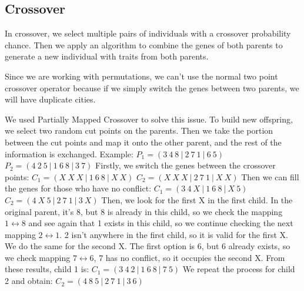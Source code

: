 \subsection{Crossover}
In crossover, we select multiple pairs of individuals with a crossover probability chance. Then we apply an algorithm to combine the genes of both parents to generate a new individual with traits from both parents.
\par
Since we are working with permutations, we can't use the normal two point crossover operator because if we simply switch the genes between two parents, we will have duplicate cities.
\par
We used Partially Mapped Crossover to solve this issue. To build new offspring, we select two random cut points on the parents. Then we take the portion between the cut points and map it onto the other parent, and the rest of the information is exchanged.
\newline
Example:
\newline
$P_{1} = (3\:4\:8\:|\:2\:7\:1\:|\:6\:5)$
\newline
$P_{2} = (4\:2\:5\:|\:1\:6\:8\:|\:3\:7)$
\newline
Firstly, we switch the genes between the crossover points:
\newline
$C_{1} = (X\:X\:X\:|\:1\:6\:8\:|\:X\:X)$
\newline
$C_{2} = (X\:X\:X\:|\:2\:7\:1\:|\:X\:X)$
\newline
Then we can fill the genes for those who have no conflict:
\newline
$C_{1} = (3\:4\:X\:|\:1\:6\:8\:|\:X\:5)$
\newline
$C_{2} = (4\:X\:5\:|\:2\:7\:1\:|\:3\:X)$
\newline
Then, we look for the first X in the first child. In the original parent, it's 8, but 8 is already in this child, so we check the mapping $1 \leftrightarrow 8$ and see again that 1 exists in this child, so we continue checking the next mapping $2\leftrightarrow 1$. 2 isn't anywhere in the first child, so it is valid for the first X. We do the same for the second X. The first option is 6, but 6 already exists, so we check mapping $7 \leftrightarrow 6$, 7 has no conflict, so it occupies the second X. From these results, child 1 is:
\newline
$C_{1} = (3\:4\:2\:|\:1\:6\:8\:|\:7\:5)$
\newline
We repeat the process for child 2 and obtain:
\newline
$C_{2} = (4\:8\:5\:|\:2\:7\:1\:|\:3\:6)$
\newpage
